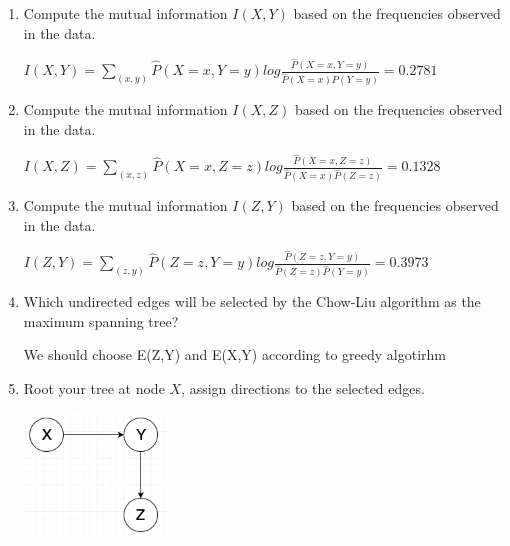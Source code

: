 \documentclass[a4paper]{article}
\theoremstyle{definition}
\newenvironment{soln}{
    \leavevmode\color{blue}\ignorespaces
}{}
\begin{document}
\begin{enumerate}
\item Compute the mutual information $I(X, Y)$ based on the frequencies observed in the data.

\begin{soln}

$I(X, Y) = \sum_{(x,y)}\hat{P}(X=x,Y=y)log\frac{\hat{P}(X=x,Y=y)}{\hat{P}(X=x)\hat{P}(Y=y)} = 0.2781$
\end{soln}

\item Compute the mutual information $I(X, Z)$ based on the frequencies observed in the data.
\begin{soln}

$I(X, Z) = \sum_{(x,z)}\hat{P}(X=x,Z=z)log\frac{\hat{P}(X=x,Z=z)}{\hat{P}(X=x)\hat{P}(Z=z)} = 0.1328$
\end{soln}
\item Compute the mutual information $I(Z, Y)$ based on the frequencies observed in the data.
\begin{soln}

$I(Z, Y) = \sum_{(z,y)}\hat{P}(Z=z,Y=y)log\frac{\hat{P}(Z=z,Y=y)}{\hat{P}(Z=z)\hat{P}(Y=y)} = 0.3973$
\end{soln}
\item Which undirected edges will be selected by the Chow-Liu algorithm as the maximum spanning tree?
\begin{soln}

We should choose E(Z,Y) and E(X,Y) according to greedy algotirhm
\end{soln}
\item Root your tree at node $X$, assign directions to the selected edges.
\begin{soln}

\includegraphics[width=0.3\textwidth]{q25.png}
\end{soln}

\end{enumerate}
\end{document}
